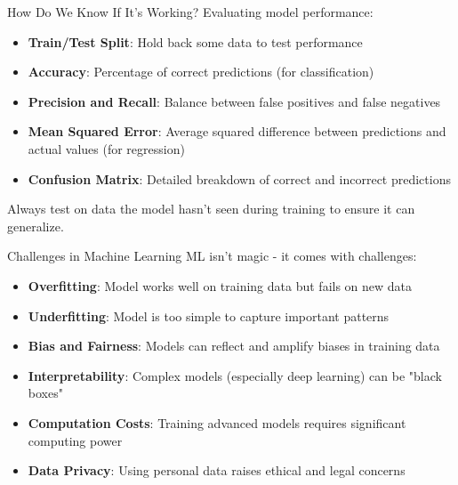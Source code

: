 \documentclass{beamer}
\begin{document}
\begin{frame}{How Do We Know If It's Working?}
  Evaluating model performance:
  
  \begin{itemize}
    \item \textbf{Train/Test Split}: Hold back some data to test performance
    \item \textbf{Accuracy}: Percentage of correct predictions (for classification)
    \item \textbf{Precision and Recall}: Balance between false positives and false negatives
    \item \textbf{Mean Squared Error}: Average squared difference between predictions and actual values (for regression)
    \item \textbf{Confusion Matrix}: Detailed breakdown of correct and incorrect predictions
  \end{itemize}
  
  \vspace{0.3cm}
  
  Always test on data the model hasn't seen during training to ensure it can generalize.
\end{frame}

\begin{frame}{Challenges in Machine Learning}
  ML isn't magic - it comes with challenges:
  
  \begin{itemize}
    \item \textbf{Overfitting}: Model works well on training data but fails on new data
    \item \textbf{Underfitting}: Model is too simple to capture important patterns
    \item \textbf{Bias and Fairness}: Models can reflect and amplify biases in training data
    \item \textbf{Interpretability}: Complex models (especially deep learning) can be "black boxes"
    \item \textbf{Computation Costs}: Training advanced models requires significant computing power
    \item \textbf{Data Privacy}: Using personal data raises ethical and legal concerns
  \end{itemize}
\end{frame}
\end{document}

